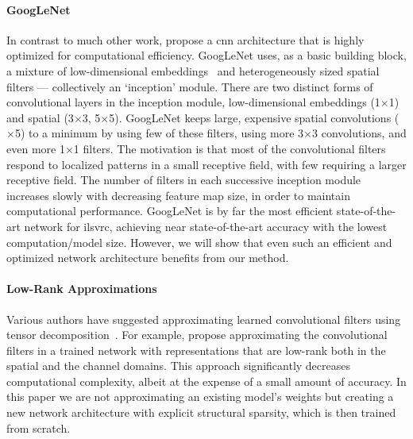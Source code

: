 \documentclass[thesis]{subfiles}
\begin{document}
	\paragraph{GoogLeNet} In contrast to much other work, \citet{Szegedy2014going} propose a \gls{cnn} architecture that is highly optimized for computational efficiency. GoogLeNet uses, as a basic building block, a mixture of low-dimensional embeddings~\citep{Lin2013NiN} and heterogeneously sized spatial filters --- collectively an `inception' module. 
	There are two distinct forms of convolutional layers in the inception module, low-dimensional embeddings (1$\times$1) and spatial (3$\times$3, 5$\times $5). GoogLeNet keeps large, expensive spatial convolutions ($\times$5) to a minimum by using few of these filters, using more 3$\times$3 convolutions, and even more 1$\times$1 filters. The motivation is that most of the convolutional filters respond to localized patterns in a small receptive field, with few requiring a larger receptive field. The number of filters in each successive inception module increases slowly with decreasing feature map size, in order to maintain computational performance. GoogLeNet is by far the most efficient state-of-the-art network for \gls{ilsvrc}, achieving near state-of-the-art accuracy with the lowest computation/model size. However, we will show that even such an efficient and optimized network architecture benefits from our method.
	
	\paragraph{Low-Rank Approximations}
	Various authors have suggested approximating learned convolutional filters using tensor decomposition~\citep{journals/corr/JaderbergVZ14,journals/corr/LebedevGROL14,Kim2016}. For example, \citet{journals/corr/JaderbergVZ14} propose approximating the convolutional filters in a trained network with representations that are low-rank both in the spatial and the channel domains. This approach significantly decreases computational complexity, albeit at the expense of a small amount of accuracy. In this paper we are not approximating an existing model's weights but creating a new network architecture with explicit structural sparsity, which is then trained from scratch.
	
\end{document}

